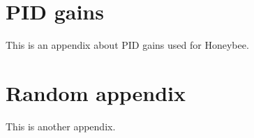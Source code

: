 \chapter{PID gains}
\makeatletter{}\makeatother
\label{appen:pid_gains}

This is an appendix about PID gains used for Honeybee.

\chapter{Random appendix}
\makeatletter{}\makeatother
\label{appen:random}

This is another appendix.
